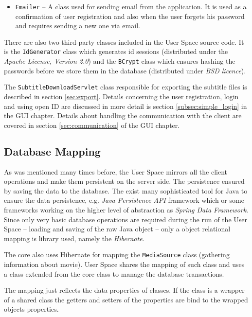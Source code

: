 \begin{itemize}
\item {\tt Emailer} -- A class used for sending email from the application. It is used as a confirmation of user registration and also when the user forgets his password and requires sending a new one via email.

\end{itemize}

There are also two third-party classes included in the User Space source code. It is the {\tt IdGenerator} class which generates id sessions (distributed under the {\it Apache License, Version 2.0}) and the {\tt BCrypt} class which ensures hashing the passwords before we store them in the database (distributed under {\it BSD licence}).

The {\tt SubtitleDownloadServlet} class responsible for exporting the subtitle files is described in section \ref{sec:export}. Details concerning the user registration, login and using open ID are discussed in more detail is section \ref{subsec:simple_login} in the GUI chapter. Details about handling the communication with the client are covered in section \ref{sec:communication} of the GUI chapter.

\subsection{Database Mapping}

As was mentioned many times before, the User Space mirrors all the client operations and make them persistent on the server side. The persistence ensured by saving the data to the database. The exist many sophisticated tool for Java to ensure the data persistence, e.g. \emph{Java Persistence API} framework which or some frameworks working on the higher level of abstraction as \emph{Spring Data Framework}. Since only very basic database operations are required during the run of the User Space -- loading and saving of the raw Java object -- only a object relational mapping is library used, namely the \emph{Hibernate}.

The core also uses Hibernate for mapping the {\tt MediaSource} class (gathering information about movie). User Space shares the mapping of such class and uses a class extended from the core class to manage the database transactions.

The mapping just reflects the data properties of classes. If the class is a wrapper of a shared class the getters and setters of the properties are bind to the wrapped objects properties.

